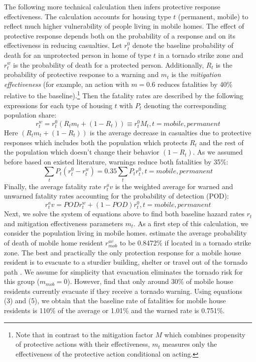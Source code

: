 \documentclass{ametsocV6.1}
\begin{document}
The following more technical calculation then infers protective response effectiveness. The calculation accounts for housing type $t$ (permanent, mobile) to reflect much higher vulnerability of people living in mobile homes. The effect of protective response depends both on the probability of a response and on its effectiveness in reducing casualties. Let $r_t^0$ denote the baseline probability of death for an unprotected person in home of type $t$ in a tornado strike zone and $r_t^w$ is the probability of death for a protected person. Additionally,  $R_t$ is the probability of protective response to a warning and $m_t$ is the \textit{mitigation effectiveness} (for example, an action with $m=0.6$ reduces fatalities by 40\% relative to the baseline).\footnote{Note that in contrast to the mitigation factor $M$ which combines propensity of protective actions with their effectiveness, $m_t$ measures only the effectiveness of the protective action conditional on acting.} Then the fatality rates are described by the following expressions for each type of housing $t$ with $P_t$ denoting the corresponding population share:
\begin{equation}
r^w_t=r^0_t(R_tm_t+(1-R_t))\equiv r^0_t M_t,t=mobile,permanent 
\end{equation}
Here $(R_tm_t+(1-R_t))$ is the average decrease in casualties due to protective responses which includes both the population which protects $R_t$ and the rest of the population which doesn't change their behavior $(1-R_t)$. As we assumed before based on existed literature, warnings reduce both fatalities by 35\%:
\begin{equation}
\sum_t P_t (r^0_t-r^w_t)=0.35 \sum_t P_t r^0_t,t=mobile,permanent 
\end{equation}
Finally, the average fatality rate $r_t^av$ is the weighted average for warned and unwarned fatality rates accounting for the probability of detection (POD):
\begin{equation}
r_t^av=PODr_t^w+(1-POD)r_t^0,t=mobile,permanent     
\end{equation}
Next, we solve the system of equations above to find both baseline hazard rates $r_t$ and mitigation effectiveness parameters $m_t$. As a first step of this calculation, we consider the population living in mobile homes. \citet{simmons_economic_2013} estimate the average probability of death of mobile home resident $r_{mob}^{av}$ to be 0.8472\% if located in a tornado strike zone. The best and practically the only protection response for a mobile house resident is to evacuate to a sturdier building, shelter or travel out of the tornado path \citep{schmidlin_tornado_2009}. We assume for simplicity that evacuation eliminates the tornado risk for this group ($m_{mob}=0$). However, \citet{schmidlin_tornado_2009} find that only around 30\% of mobile house residents currently evacuate if they receive a tornado warning. Using equations (3) and (5), we obtain that the baseline rate of fatalities for mobile house residents is 110\% of the average or 1.01\% and the warned rate is 0.751\%.
\end{document}
